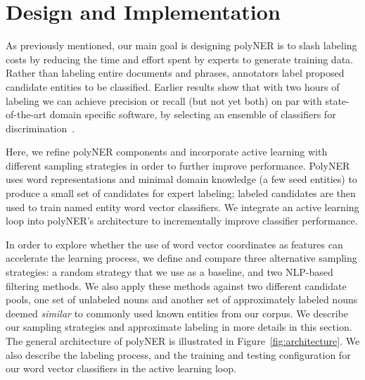 \section{Design and Implementation}
\label{sect:apner_architecture}
As previously mentioned, our main goal is designing polyNER is to slash labeling costs by reducing the time and effort spent by experts to generate training data. 
Rather than labeling entire documents and phrases, annotators label proposed candidate entities to be classified.
Earlier results show that with two hours of labeling we can achieve
precision or recall (but not yet both) on par with state-of-the-art domain specific software, by selecting an ensemble of classifiers for discrimination~\cite{tchoua2019polyner}. %

Here, we refine polyNER components and incorporate active learning with different sampling strategies in order to further improve performance.
PolyNER uses word representations and minimal domain knowledge (a few
seed entities) to produce a small set of candidates for expert labeling;
labeled candidates are then used to train named entity word vector classifiers.
We integrate an active learning loop into polyNER's architecture to incrementally improve classifier performance.

In order to explore whether the use of word vector coordinates as features can accelerate the learning process,
we define and compare three alternative sampling strategies: a random strategy that we use as a baseline,
and two NLP-based filtering methods. 
We also apply these methods against two different candidate pools, 
one set of unlabeled nouns and another set of approximately labeled nouns deemed \textit{similar} to commonly used known entities from our corpus.
We describe our sampling strategies and approximate labeling in more details in this section.
The general architecture of polyNER is illustrated in Figure~\ref{fig:architecture}.
We also describe the labeling process, and the training and testing configuration for our word vector classifiers in the active learning loop. 

